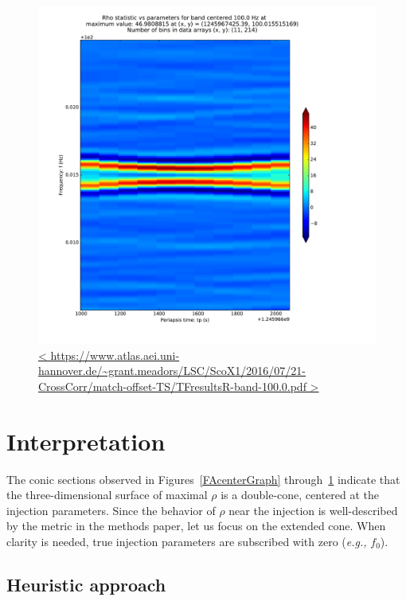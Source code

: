 \documentclass{article}
\begin{document}
\begin{figure}
\begin{center}
\includegraphics[trim= 0 0 0 0, clip, width=0.80\paperwidth,keepaspectratio]{plots/match-offset-TS/TFresultsR-band-100-0.pdf}
\caption{
\url{<
https://www.atlas.aei.uni-hannover.de/~grant.meadors/LSC/ScoX1/2016/07/21-CrossCorr/match-offset-TS/TFresultsR-band-100.0.pdf
>}
}
\label{TFoffsetGraph}
\end{center}
\end{figure}

\section{Interpretation}

The conic sections observed in Figures~\ref{FAcenterGraph} through~\ref{TFoffsetGraph} indicate that the three-dimensional surface of maximal $\rho$ is a double-cone, centered at the injection parameters.
Since the behavior of $\rho$ near the injection is well-described by the metric in the methods paper, let us focus on the extended cone.
When clarity is needed, true injection parameters are subscribed with zero (\textit{e.g.,} $f_0$).

\subsection{Heuristic approach}
\end{document}
